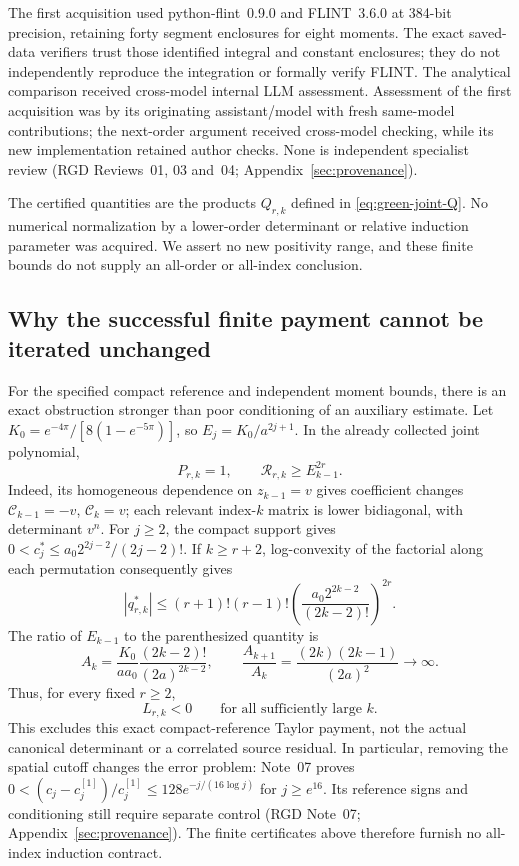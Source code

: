 The first acquisition used python-flint~0.9.0 and FLINT~3.6.0 at
384-bit precision, retaining forty segment enclosures for eight moments.
The exact saved-data verifiers trust those identified integral and
constant enclosures; they do not independently reproduce the integration
or formally verify FLINT.  The analytical comparison received
cross-model internal LLM assessment.  Assessment of the first acquisition
was by its originating assistant/model with fresh same-model contributions;
the next-order argument received cross-model checking, while its new
implementation retained author checks.  None is independent specialist
review (RGD Reviews~01, 03 and~04; Appendix~\ref{sec:provenance}).

The certified quantities are the products \(Q_{r,k}\) defined in
\eqref{eq:green-joint-Q}.  No numerical normalization by a lower-order
determinant or relative induction parameter was acquired.  We assert no
new positivity range, and these finite bounds do not supply an all-order
or all-index conclusion.

\subsection{Why the successful finite payment cannot be iterated unchanged}
For the specified compact reference and independent moment bounds,
there is an exact obstruction stronger than poor conditioning of an
auxiliary estimate.  Let
\(K_0=e^{-4\pi}/[8(1-e^{-5\pi})]\), so \(E_j=K_0/a^{2j+1}\).
In the already collected joint polynomial,
\begin{equation}
 [z_{k-1}^{2r}]P_{r,k}=1,\qquad
 \mathcal R_{r,k}\ge E_{k-1}^{2r}.
\end{equation}
Indeed, its homogeneous dependence on \(z_{k-1}=v\) gives coefficient
changes \(\mathcal C_{k-1}=-v\), \(\mathcal C_k=v\); each relevant
index-\(k\) matrix is lower bidiagonal, with determinant \(v^n\).
For \(j\ge2\), the compact support gives
\(0<c_j^*\le a_0 2^{2j-2}/(2j-2)!\).  If \(k\ge r+2\),
log-convexity of the factorial along each permutation consequently gives
\begin{equation}
 |q^*_{r,k}|\le(r+1)!(r-1)!
       \left(\frac{a_0 2^{2k-2}}{(2k-2)!}\right)^{2r}.
\end{equation}
The ratio of \(E_{k-1}\) to the parenthesized quantity is
\begin{equation}
 A_k=\frac{K_0}{aa_0}\frac{(2k-2)!}{(2a)^{2k-2}},\qquad
 \frac{A_{k+1}}{A_k}=\frac{(2k)(2k-1)}{(2a)^2}\longrightarrow\infty.
\end{equation}
Thus, for every fixed \(r\ge2\),
\begin{equation}
 L_{r,k}<0\qquad\text{for all sufficiently large }k.
 \label{eq:green-exact-payment-stop}
\end{equation}
This excludes this exact compact-reference Taylor payment, not the actual
canonical determinant or a correlated source residual.  In particular,
removing the spatial cutoff changes the error problem: Note~07 proves
\(0<(c_j-c_j^{[1]})/c_j^{[1]}\le128e^{-j/(16\log j)}\) for
\(j\ge e^{16}\).  Its reference signs and conditioning still require
separate control (RGD Note~07; Appendix~\ref{sec:provenance}).  The finite certificates above
therefore furnish no all-index induction contract.
